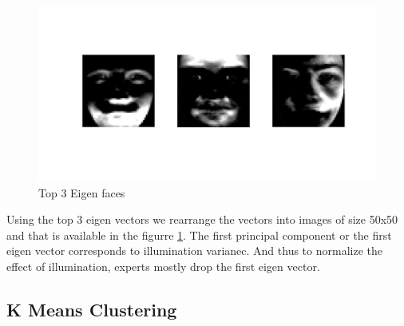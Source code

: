 \documentclass[conference]{IEEEtran}
\begin{document}
\begin{figure}[h!]
\centering
\includegraphics[scale=0.15]{top3eigenfaces.jpg}
\caption{Top 3 Eigen faces }
\label{fig:top3}
\end{figure}

Using the top 3 eigen vectors we  rearrange the vectors into images of size 50x50 and that is available in the figurre \ref{fig:top3}. The first principal component or the first eigen vector corresponds to illumination varianec. And thus to normalize the effect of illumination, experts mostly drop the first eigen vector.

\subsection{K Means Clustering}
\end{document}

